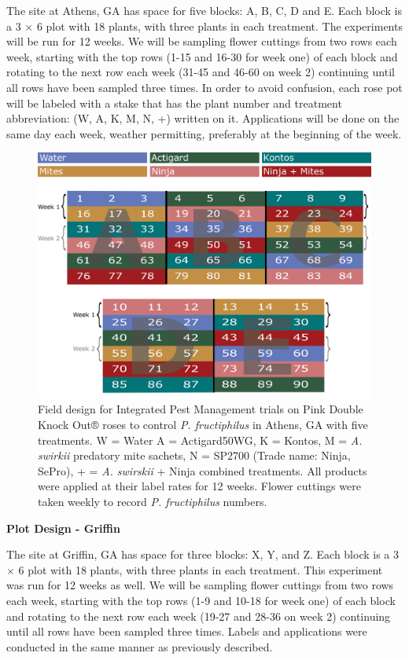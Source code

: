 \documentclass[12pt,final,CPage]{ufthesis}
\begin{document}
{  The site at Athens, GA has space for five blocks: A, B, C, D and E. Each block is a 3 \(\times\) 6 plot with 18 plants, with three plants in each treatment. The experiments will be run for 12 weeks. We will be sampling flower cuttings from two rows each week, starting with the top rows (1-15 and 16-30 for week one) of each block and rotating to the next row each week (31-45 and 46-60 on week 2) continuing until all rows have been sampled three times. In order to avoid confusion, each rose pot will be labeled with a stake that has the plant number and treatment abbreviation: (W, A, K, M, N, +) written on it. Applications will be done on the same day each week, weather permitting, preferably at the beginning of the week.
  \begin{figure}

  {\centering \includegraphics[width=0.8\linewidth]{figure/rrv_ipm_plot_map_2019_athens} 

  }

  \caption{Field design for Integrated Pest Management trials on Pink Double Knock Out® roses to control \textit{P. fructiphilus} in Athens, GA with five treatments. W = Water A = Actigard50WG, K = Kontos, M = \textit{A. swirkii} predatory mite sachets, N = SP2700 (Trade name: Ninja, SePro), + = \textit{A. swirskii} + Ninja combined treatments. All products were applied at their label rates for 12 weeks. Flower cuttings were taken weekly to record \textit{P. fructiphilus} numbers.}\label{fig:ipm-athens}
  \end{figure}
  \textbf{Plot Design - Griffin}

  The site at Griffin, GA has space for three blocks: X, Y, and Z. Each block is a 3 \(\times\) 6 plot with 18 plants, with three plants in each treatment. This experiment was run for 12 weeks as well. We will be sampling flower cuttings from two rows each week, starting with the top rows (1-9 and 10-18 for week one) of each block and rotating to the next row each week (19-27 and 28-36 on week 2) continuing until all rows have been sampled three times. Labels and applications were conducted in the same manner as previously described.
  \begin{figure}


\end{figure}}
\end{document}
